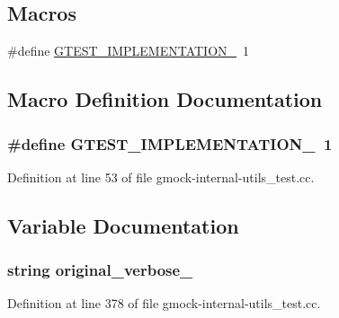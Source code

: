 \subsection*{Macros}
\begin{DoxyCompactItemize}
\item 
\#define \hyperlink{gmock-internal-utils__test_8cc_a83bd232fd1077579fada92c31bb7469f}{G\+T\+E\+S\+T\+\_\+\+I\+M\+P\+L\+E\+M\+E\+N\+T\+A\+T\+I\+O\+N\+\_\+}~1
\end{DoxyCompactItemize}


\subsection{Macro Definition Documentation}
\subsubsection[{\texorpdfstring{G\+T\+E\+S\+T\+\_\+\+I\+M\+P\+L\+E\+M\+E\+N\+T\+A\+T\+I\+O\+N\+\_\+}{GTEST_IMPLEMENTATION_}}]{\setlength{\rightskip}{0pt plus 5cm}\#define G\+T\+E\+S\+T\+\_\+\+I\+M\+P\+L\+E\+M\+E\+N\+T\+A\+T\+I\+O\+N\+\_\+~1}\hypertarget{gmock-internal-utils__test_8cc_a83bd232fd1077579fada92c31bb7469f}{}\label{gmock-internal-utils__test_8cc_a83bd232fd1077579fada92c31bb7469f}


Definition at line 53 of file gmock-\/internal-\/utils\+\_\+test.\+cc.



\subsection{Variable Documentation}
\subsubsection[{\texorpdfstring{original\+\_\+verbose\+\_\+}{original_verbose_}}]{\setlength{\rightskip}{0pt plus 5cm}string original\+\_\+verbose\+\_\+\hspace{0.3cm}{\ttfamily [protected]}}\hypertarget{gmock-internal-utils__test_8cc_a012736b03d0c8d916dfc1884f4817504}{}\label{gmock-internal-utils__test_8cc_a012736b03d0c8d916dfc1884f4817504}


Definition at line 378 of file gmock-\/internal-\/utils\+\_\+test.\+cc.

